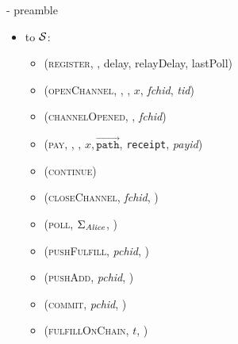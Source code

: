 \begin{figure}[H]
\begin{systembox}{\fpaynet{} - preamble}
\begin{itemize}
\begin{itemize}
          \item (\textsc{corrupted}, \alice)
          \item (\textsc{channelAnnounced}, \alice, $p_{\alice, F}, p_{\bob,
          F}$, \textit{fchid}, \textit{pchid}, \textit{tid})
          \item (\textsc{update}, \texttt{receipt}, \alice)
          \item (\textsc{resolvePays}, \textit{payid}, \texttt{charged})
        \end{itemize}
        \item to $\mathcal{S}$:
        \begin{itemize}
          \item (\textsc{register}, \alice, delay, relayDelay, lastPoll)
          \item (\textsc{openChannel}, \alice, \bob, $x$, \textit{fchid},
          \textit{tid})
          \item (\textsc{channelOpened}, \alice, \textit{fchid})
          \item (\textsc{pay}, \alice, \bob, $x,
          \overrightarrow{\mathtt{path}}$, \texttt{receipt}, \textit{payid})
          \item (\textsc{continue})
          \item (\textsc{closeChannel}, \textit{fchid}, \alice)
          \item (\textsc{poll}, $\Sigma_{\mathit{Alice}}$, \alice)
          \item (\textsc{pushFulfill}, \textit{pchid}, \alice)
          \item (\textsc{pushAdd}, \textit{pchid}, \alice)
          \item (\textsc{commit}, \textit{pchid}, \alice)
          \item (\textsc{fulfillOnChain}, $t$, \alice)
        \end{itemize}
      \end{itemize}
    \end{systembox}
    \caption{}
    \label{alg:fpaynet:interface}
  \end{figure}

